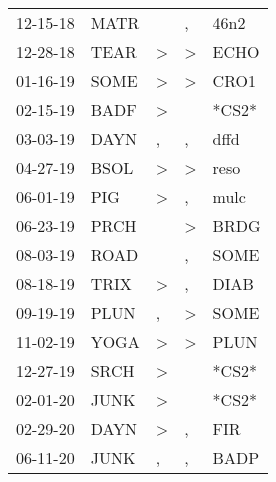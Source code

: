 \begin{supertabular}{p{0.07\textwidth}p{0.06\textwidth}p{0.02\textwidth}p{0.02\textwidth}p{0.06\textwidth}}
          12-15-18\textsuperscript{} &           MATR\textsuperscript{} &                  &                , &           46n2\textsuperscript{} \\
          12-28-18\textsuperscript{} &           TEAR\textsuperscript{} &     \textgreater &     \textgreater &           ECHO\textsuperscript{} \\
          01-16-19\textsuperscript{} &           SOME\textsuperscript{} &     \textgreater &     \textgreater &           CRO1\textsuperscript{} \\
          02-15-19\textsuperscript{} &           BADF\textsuperscript{} &     \textgreater &                  &                            *CS2* \\
          03-03-19\textsuperscript{} &           DAYN\textsuperscript{} &                , &                , &           dffd\textsuperscript{} \\
          04-27-19\textsuperscript{} &           BSOL\textsuperscript{} &     \textgreater &     \textgreater &           reso\textsuperscript{} \\
          06-01-19\textsuperscript{} &            PIG\textsuperscript{} &     \textgreater &                , &           mulc\textsuperscript{} \\
          06-23-19\textsuperscript{} &           PRCH\textsuperscript{} &                  &     \textgreater &           BRDG\textsuperscript{} \\
          08-03-19\textsuperscript{} &           ROAD\textsuperscript{} &                  &                , &           SOME\textsuperscript{} \\
          08-18-19\textsuperscript{} &           TRIX\textsuperscript{} &     \textgreater &                , &           DIAB\textsuperscript{} \\
          09-19-19\textsuperscript{} &           PLUN\textsuperscript{} &                , &     \textgreater &           SOME\textsuperscript{} \\
          11-02-19\textsuperscript{} &           YOGA\textsuperscript{} &     \textgreater &     \textgreater &           PLUN\textsuperscript{} \\
          12-27-19\textsuperscript{} &           SRCH\textsuperscript{} &     \textgreater &                  &                            *CS2* \\
          02-01-20\textsuperscript{} &           JUNK\textsuperscript{} &     \textgreater &                  &                            *CS2* \\
          02-29-20\textsuperscript{} &           DAYN\textsuperscript{} &     \textgreater &                , &            FIR\textsuperscript{} \\
          06-11-20\textsuperscript{} &           JUNK\textsuperscript{} &                , &                , &           BADP\textsuperscript{} \\
\end{supertabular}
